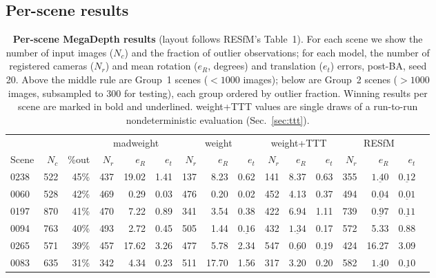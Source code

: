 \documentclass[10pt,twocolumn,letterpaper]{article}
\begin{document}
\subsection{Per-scene results}\label{sec:perscene}
\begin{table}[t]\centering\footnotesize
\caption{\textbf{Per-scene MegaDepth results} (layout follows RESfM's Table~1). For each
scene we show the number of input images ($N_c$) and the fraction of outlier
observations; for each model, the number of registered cameras ($N_r$) and mean
rotation ($e_R$, degrees) and translation ($e_t$) errors, post-BA, seed 20. Above the middle rule are Group~1
scenes ($<1000$ images); below are Group~2 scenes ($>1000$ images, subsampled to $300$
for testing), each group ordered by outlier fraction. Winning results per scene are
marked in bold and underlined. weight+TTT values are single draws of a run-to-run
nondeterministic evaluation (Sec.~\ref{sec:ttt}).}
\label{tab:supp_perscene_md}
\setlength{\tabcolsep}{2.5pt}%
\begin{tabular}{lrrrrrrrrrrrrrrr}
\toprule
& & & \multicolumn{3}{c}{madweight} & \multicolumn{3}{c}{weight} & \multicolumn{3}{c}{weight+TTT} & \multicolumn{3}{c}{RESfM}\\
\cmidrule(lr){4-6}\cmidrule(lr){7-9}\cmidrule(lr){10-12}\cmidrule(lr){13-15}
Scene & $N_c$ & \%out & $N_r$ & $e_R$ & $e_t$ & $N_r$ & $e_R$ & $e_t$ & $N_r$ & $e_R$ & $e_t$ & $N_r$ & $e_R$ & $e_t$\\
\midrule
0238 & 522 & 45\% & 437 & 19.02 & 1.41 & 137 & 8.23 & 0.62 & 141 & 8.37 & 0.63 & 355 & $\underline{\mathbf{1.40}}$ & $\underline{\mathbf{0.12}}$\\
0060 & 528 & 42\% & 469 & 0.29 & 0.03 & 476 & 0.20 & 0.02 & 452 & 4.13 & 0.37 & 494 & $\underline{\mathbf{0.04}}$ & $\underline{\mathbf{0.01}}$\\
0197 & 870 & 41\% & 470 & 7.22 & 0.89 & 341 & 3.54 & 0.38 & 422 & 6.94 & 1.11 & 739 & $\underline{\mathbf{0.97}}$ & $\underline{\mathbf{0.11}}$\\
0094 & 763 & 40\% & 493 & 2.72 & 0.45 & 505 & 1.44 & $\underline{\mathbf{0.16}}$ & 432 & $\underline{\mathbf{1.34}}$ & 0.17 & 572 & 5.33 & 0.88\\
0265 & 571 & 39\% & 457 & 17.62 & 3.26 & 477 & 5.78 & 2.34 & 547 & $\underline{\mathbf{0.60}}$ & $\underline{\mathbf{0.19}}$ & 424 & 16.27 & 3.09\\
0083 & 635 & 31\% & 342 & 4.34 & 0.23 & 511 & 17.70 & 1.56 & 317 & 3.20 & 0.20 & 582 & $\underline{\mathbf{1.40}}$ & $\underline{\mathbf{0.10}}$\\

\end{tabular}
\end{table}
\end{document}
